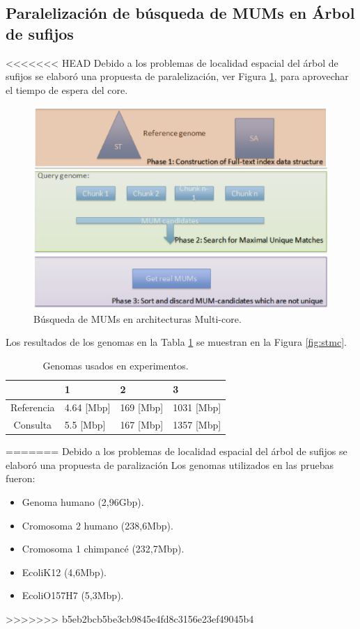 \documentclass[12pt,a4paper]{article}
\begin{document}
\subsection{Paralelización de búsqueda de MUMs en Árbol de sufijos}
<<<<<<< HEAD
Debido a los problemas de localidad espacial del árbol de sufijos se elaboró una propuesta de paralelización, ver Figura \ref{phases}, para aprovechar el tiempo de espera del core. 
 \begin{figure}[h!] 
   \centering 
   \includegraphics[scale=0.5]{Phases.ps} 
    \caption{Búsqueda de MUMs en architecturas Multi-core.} 
   \label{phases} 
 \end{figure}
 \vspace{0.5cm}
Los resultados de los genomas en la Tabla \ref{genomes} se muestran en la Figura \ref{fig:stmc}.
\begin{table} 
\centering
\caption{Genomas usados en experimentos.}
\label{genomes}
\begin{tabular}{|c|l|l|l|} \hline
  & 1 & 2 & 3 \\ \hline
  Referencia & 4.64 [Mbp] & 169 [Mbp] & 1031 [Mbp] \\ \hline
  Consulta & 5.5 [Mbp] & 167 [Mbp] & 1357 [Mbp] \\ 
  \hline
\end{tabular}
\end{table}
=======
Debido a los problemas de localidad espacial del árbol de sufijos se elaboró una propuesta de paralización
\indent
Los genomas utilizados en las pruebas fueron:
\begin{itemize}
\item Genoma humano (2,96Gbp).
\item Cromosoma 2 humano (238,6Mbp).
\item Cromosoma 1 chimpancé (232,7Mbp).
\item EcoliK12 (4,6Mbp).
\item EcoliO157H7 (5,3Mbp).
\end{itemize}
>>>>>>> b5eb2bcb5be3cb9845e4fd8c3156e23ef49045b4
\end{document}
